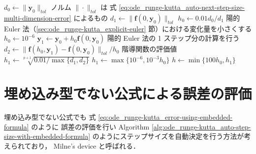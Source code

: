 \begin{algorithm}[tp]
    \caption{初期ステップサイズの自動決定 \cite[Section II.4]{Hairer1993}}
    \label{alg:ode_runge-kutta_auto-step-size-init}
    \begin{algorithmic}[1]
        \State $d_0 \gets \|\bm{y}_0\|_{tol}$
        \Comment ノルム $\| \cdot \|_{tol}$ は
        式 \eqref{eq:ode_runge-kutta_auto-next-step-size-multi-dimension-error} によるもの
        \State $d_1 \gets \|\bm{f}(0, \bm{y}_0)\|_{tol}$
        \State $h_0 \gets 0.01 d_0 / d_1$
        \Comment 陽的 Euler 法（\ref{sec:ode_runge-kutta_explicit-euler} 節）における変化量を小さくする
        \Else
        \State $h_0 \gets 10^{-6}$
        \EndIf
        \State $\bm{y}_1 \gets \bm{y}_0 + h_0 \bm{f}(0, \bm{y}_0)$
        \Comment 陽的 Euler 法の 1 ステップ分の計算を行う
        \State $d_2 \gets \|\bm{f}(h_0, \bm{y}_1) - \bm{f}(0, \bm{y}_0)\|_{tol} / h_0$
         階導関数の評価値
        \State $h_1 \gets \sqrt[p+1]{0.01 / \max{\{d_1, d_2\}}}$
        \Else
        \State $h_1 \gets \max{\{10^{-6}, 10^{-3} h_0\}}$
        \EndIf
        \State $h \gets \min{\{100 h_0, h_1\}}$
        \EndProcedure
    \end{algorithmic}
\end{algorithm}

\section{埋め込み型でない公式による誤差の評価}

埋め込み型でない公式でも
式 \eqref{eq:ode_runge-kutta_error-using-embedded-formula} のように
誤差の評価を行い
Algorithm \ref{alg:ode_runge-kutta_auto-step-size-with-embedded-formula}
のようにステップサイズを自動決定を行う方法が考えられており，
Milne's device \cite[4.1 節 (b)]{Mitsui1993} と呼ばれる．


